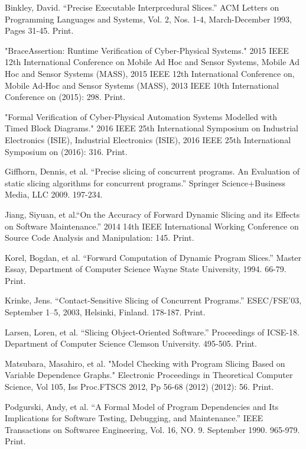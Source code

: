 \documentclass[peerreview]{IEEEtran}
\begin{document}
\begin{thebibliography}{1}
 Binkley, David. “Precise Executable Interprcedural Slices.” ACM Letters on Programming Languages and Systems, Vol. 2, Nos. 1-4, March-December 1993, Pages 31-45. Print.

 "BraceAssertion: Runtime Verification of Cyber-Physical Systems." 2015 IEEE 12th International Conference on Mobile Ad Hoc and Sensor Systems, Mobile Ad Hoc and Sensor Systems (MASS), 2015 IEEE 12th International Conference on, Mobile Ad-Hoc and Sensor Systems (MASS), 2013 IEEE 10th International Conference on (2015): 298. Print. 

 "Formal Verification of Cyber-Physical Automation Systems Modelled with Timed Block Diagrams." 2016 IEEE 25th International Symposium on Industrial Electronics (ISIE), Industrial Electronics (ISIE), 2016 IEEE 25th International Symposium on (2016): 316. Print. 

 Giffhorn, Dennis, et al. “Precise slicing of concurrent programs. An Evaluation of static slicing algorithms for concurrent programs.” Springer Science+Business Media, LLC 2009. 197-234. 

 Jiang, Siyuan, et al.“On the Accuracy of Forward Dynamic Slicing and its Effects on Software Maintenance.” 2014 14th IEEE International Working     Conference on Source Code Analysis and Manipulation: 145. Print.

 Korel, Bogdan, et al. “Forward Computation of Dynamic Program Slices.” Master Essay, Department of Computer Science Wayne State University, 1994. 66-79. Print.

 Krinke, Jens. “Contact-Sensitive Slicing of Concurrent Programs.” ESEC/FSE’03, September 1–5, 2003, Helsinki, Finland. 178-187. Print. 

 Larsen, Loren, et al. “Slicing Object-Oriented Software.” Proceedings of ICSE-18. Department of Computer Science Clemson University. 495-505. Print. 

 Matsubara, Masahiro, et al. "Model Checking with Program Slicing Based on Variable Dependence Graphs." Electronic Proceedings in Theoretical Computer Science, Vol 105, Iss Proc.FTSCS 2012, Pp 56-68 (2012) (2012): 56. Print. 

 Podgurski, Andy, et al. “A Formal Model of Program Dependencies and Its Implications for Software Testing, Debugging, and Maintenance.” IEEE Transactions on Softwaree Engineering, Vol. 16, NO. 9. September 1990. 965-979. Print. 


\end{thebibliography}
\end{document}

